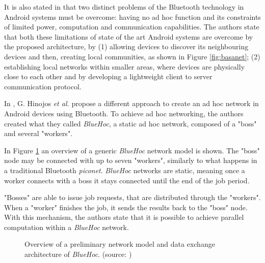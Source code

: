 It is also stated in \cite{basa} that two distinct problems of the Bluetooth technology in Android systems must be overcome: having no ad hoc function and its constraints of limited power, computation and communication capabilities. The authors state that both these limitations of state of the art Android systems are overcome by the proposed architecture, by (1) allowing devices to discover its neighbouring devices and then, creating local communities, as shown in Figure \ref{fig:basanet}; (2) establishing local networks within smaller areas, where devices are physically close to each other and by developing a lightweight client to server communication protocol.

In \cite{bluehoc}, G. Hinojos \textit{et al.} propose a different approach to create an ad hoc network in Android devices using Bluetooth. To achieve ad hoc networking, the authors created what they called \textit{BlueHoc}, a static ad hoc network, composed of a "boss" and several "workers".

In Figure \ref{fig:bluehocnet} an overview of a generic \textit{BlueHoc} network model is shown. The "boss" node may be connected with up to seven "workers", similarly to what happens in a traditional Bluetooth \textit{piconet}. \textit{BlueHoc} networks are static, meaning once a worker connects with a boss it stays connected until the end of the job period.

"Bosses" are able to issue job requests, that are distributed through the "workers". When a "worker" finishes the job, it sends the results back to the "boss" node. With this mechanism, the authors state that it is possible to achieve parallel computation within a \textit{BlueHoc} network.

\begin{figure}[ht]
	\noindent{}
	\caption{\label{fig:bluehocnet} Overview of a preliminary network model and data exchange architecture of \textit{BlueHoc}. (source: \cite{bluehoc})}
\end{figure}

